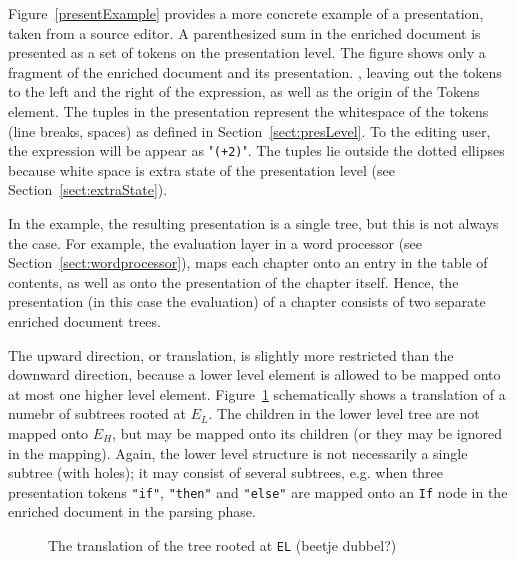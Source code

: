 Figure~\ref{presentExample} provides a more concrete example of a presentation, taken from a source editor. A parenthesized sum in the enriched document is presented as a set of tokens on the presentation level. The figure shows only a fragment of the enriched document and its presentation. \bc , leaving out the tokens to the left and the right of the expression, as well as the origin of the Tokens element. \ec The tuples in the presentation represent the whitespace of the tokens (line breaks, spaces) as defined in Section~\ref{sect:presLevel}. To the editing user, the expression will be appear as "{\tt (+2\textvisiblespace )}". The tuples lie outside the dotted ellipses because white space is extra state of the presentation level (see Section~\ref{sect:extraState}). 

\bc
In the example, the resulting presentation is a single tree, but this is not always the case. For example, the evaluation layer in a word processor (see Section~\ref{sect:wordprocessor}), maps each chapter onto an entry in the table of contents, as well as onto the presentation of the chapter itself. Hence, the presentation (in this case the evaluation) of a chapter consists of two separate enriched document trees.
\ec


The upward direction, or translation, is slightly more restricted than the downward direction, because a lower level element is allowed to be mapped onto at most one higher level element. Figure~\ref{elementTranslation} schematically shows a translation of a numebr of subtrees rooted at $E_L$. The children in the lower level tree are not mapped onto $E_H$, but may be mapped onto its children (or they may be ignored in the mapping).  Again, the lower level structure is not necessarily a single subtree (with holes); it may consist of several subtrees, e.g. when three presentation tokens \verb|"if"|, \verb|"then"| and \verb|"else"| are mapped onto an \verb|If| node in the enriched document in the parsing phase.


\begin{figure}
\begin{center}
\begin{center}
%
%
\end{center}
\caption{The translation of the tree rooted at {\tt EL} (beetje dubbel?)}\label{elementTranslation} 
\end{center}
\end{figure}


